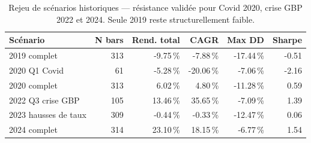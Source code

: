\begin{table}[H]
\centering
\caption{Rejeu de scénarios historiques — résistance validée pour Covid 2020, crise GBP 2022 et 2024. Seule 2019 reste structurellement faible.}
\label{tab:scenarios}
\begin{tabular}{lrrrrr}
\toprule
Scénario & N bars & Rend. total & CAGR & Max DD & Sharpe \\
\midrule
2019 complet & 313 & -9.75\,\% & -7.88\,\% & -17.44\,\% & -0.51 \\
2020 Q1 Covid & 61 & -5.28\,\% & -20.06\,\% & -7.06\,\% & -2.16 \\
2020 complet & 313 & 6.02\,\% & 4.80\,\% & -11.28\,\% & 0.59 \\
2022 Q3 crise GBP & 105 & 13.46\,\% & 35.65\,\% & -7.09\,\% & 1.39 \\
2023 hausses de taux & 309 & -0.44\,\% & -0.33\,\% & -12.47\,\% & 0.06 \\
2024 complet & 314 & 23.10\,\% & 18.15\,\% & -6.77\,\% & 1.54 \\
\bottomrule
\end{tabular}
\end{table}
